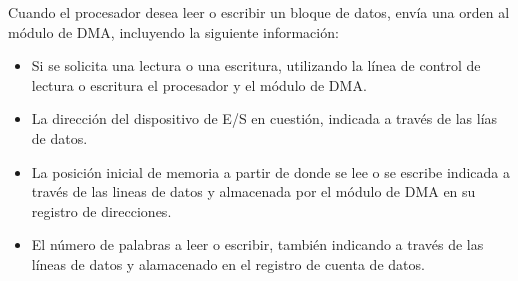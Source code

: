 Cuando el procesador desea leer o escribir un bloque de datos, envía una orden al módulo de DMA, incluyendo la siguiente información:

\begin{itemize}
  \item Si se solicita una lectura o una escritura, utilizando la línea de control de lectura o escritura el procesador y el módulo de DMA.\@
  \item La dirección del dispositivo de E/S en cuestión, indicada a través de las lías de datos.
  \item La posición inicial de memoria a partir de donde se lee o se escribe indicada a través de las lineas de datos y almacenada por el módulo de DMA en su registro de direcciones.
  \item El número de palabras a leer o escribir, también indicando a través de las líneas de datos y alamacenado en el registro de cuenta de datos.
\end{itemize}